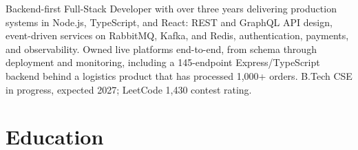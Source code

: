 \documentclass[11pt,a4paper,sans]{moderncv}
\begin{document}
\makecvtitle


\vspace{4pt}
\small{Backend-first Full-Stack Developer with over three years delivering production systems in Node.js, TypeScript, and React: REST and GraphQL API design, event-driven services on RabbitMQ, Kafka, and Redis, authentication, payments, and observability. Owned live platforms end-to-end, from schema through deployment and monitoring, including a 145-endpoint Express/TypeScript backend behind a logistics product that has processed 1,000+ orders. B.Tech CSE in progress, expected 2027; LeetCode 1,430 contest rating.}


\section{Education}
\vspace{1pt}

\end{document}
